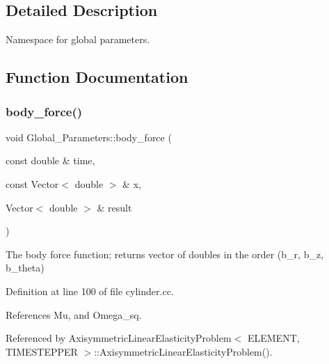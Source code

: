 \subsection{Detailed Description}
Namespace for global parameters. 

\subsection{Function Documentation}
\mbox{\label{namespaceGlobal__Parameters_a6459755c5d38e277ceddbf317c4ed179}} 
\subsubsection{\texorpdfstring{body\+\_\+force()}{body\_force()}}
{\footnotesize\ttfamily void Global\+\_\+\+Parameters\+::body\+\_\+force (\begin{DoxyParamCaption}\item[{const double \&}]{time,  }\item[{const Vector$<$ double $>$ \&}]{x,  }\item[{Vector$<$ double $>$ \&}]{result }\end{DoxyParamCaption})}



The body force function; returns vector of doubles in the order (b\+\_\+r, b\+\_\+z, b\+\_\+theta) 



Definition at line 100 of file cylinder.\+cc.



References Mu, and Omega\+\_\+sq.



Referenced by Axisymmetric\+Linear\+Elasticity\+Problem$<$ E\+L\+E\+M\+E\+N\+T, T\+I\+M\+E\+S\+T\+E\+P\+P\+E\+R $>$\+::\+Axisymmetric\+Linear\+Elasticity\+Problem().

\mbox{\label{namespaceGlobal__Parameters_a61ef31c4db13380658f6d5ea47c3369d}} 
